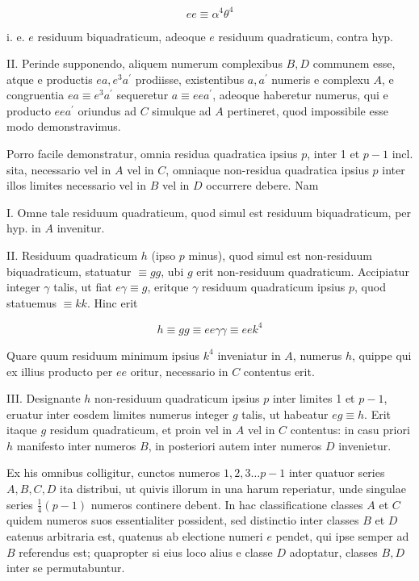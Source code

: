 \documentclass[10pt]{article}
\begin{document}
\[
e e \equiv \alpha^{4} \theta^{4}
\]

i. e. \(e\) residuum biquadraticum, adeoque \(e\) residuum quadraticum, contra hyp.

II. Perinde supponendo, aliquem numerum complexibus \(B, D\) communem esse, atque e productis \(e a, e^{3} a^{\prime}\) prodiisse, existentibus \(a, a^{\prime}\) numeris e complexu \(A\), e congruentia \(e a \equiv e^{3} a^{\prime}\) sequeretur \(a \equiv e e a^{\prime}\), adeoque haberetur numerus, qui e producto \(e e a^{\prime}\) oriundus ad \(C\) simulque ad \(A\) pertineret, quod impossibile esse modo demonstravimus.

Porro facile demonstratur, omnia residua quadratica ipsius \(p\), inter 1 et \(p-1\) incl. sita, necessario vel in \(A\) vel in \(C\), omniaque non-residua quadratica ipsius \(p\) inter illos limites necessario vel in \(B\) vel in \(D\) occurrere debere. Nam

I. Omne tale residuum quadraticum, quod simul est residuum biquadraticum, per hyp. in \(A\) invenitur.

II. Residuum quadraticum \(h\) (ipso \(p\) minus), quod simul est non-residuum biquadraticum, statuatur \(\equiv g g\), ubi \(g\) erit non-residuum quadraticum. Accipiatur integer \(\gamma\) talis, ut fiat \(e \gamma \equiv g\), eritque \(\gamma\) residuum quadraticum ipsius \(p\), quod statuemus \(\equiv k k\). Hinc erit

\[
h \equiv g g \equiv e e \gamma \gamma \equiv e e k^{4}
\]

Quare quum residuum minimum ipsius \(k^{4}\) inveniatur in \(A\), numerus \(h\), quippe qui ex illius producto per \(e e\) oritur, necessario in \(C\) contentus erit.

III. Designante \(h\) non-residuum quadraticum ipsius \(p\) inter limites 1 et \(p-1\), eruatur inter eosdem limites numerus integer \(g\) talis, ut habeatur \(e g \equiv h\). Erit itaque \(g\) residum quadraticum, et proin vel in \(A\) vel in \(C\) contentus: in casu priori \(h\) manifesto inter numeros \(B\), in posteriori autem inter numeros \(D\) invenietur.

Ex his omnibus colligitur, cunctos numeros \(1,2,3 \ldots p-1\) inter quatuor series \(A, B, C, D\) ita distribui, ut quivis illorum in una harum reperiatur, unde singulae series \(\frac{1}{4}(p-1)\) numeros continere debent. In hac classificatione classes \(A\) et \(C\) quidem numeros suos essentialiter possident, sed distinctio inter classes \(B\) et \(D\) eatenus arbitraria est, quatenus ab electione numeri \(e\) pendet, qui ipse semper ad \(B\) referendus est; quapropter si eius loco alius e classe \(D\) adoptatur, classes \(B, D\) inter se permutabuntur.
\end{document}
